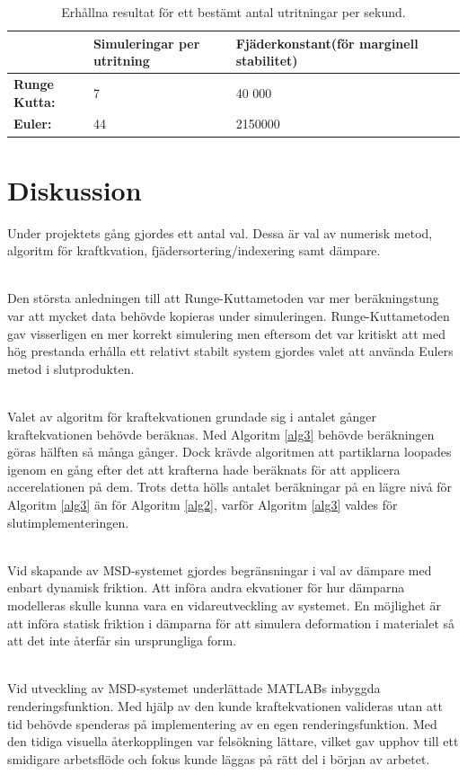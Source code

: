 \documentclass[a4paper,12pt,oneside,final,swedish]{extarticle}
\begin{document}
\begin{table}[htbp]
    \caption{Erhållna resultat för ett bestämt antal utritningar per sekund.}
    \label{table_example2}
    \begin{tabular*}{\hsize}{lllll}
      \hline %
       & \bfseries Simuleringar per utritning & \bfseries Fjäderkonstant(för marginell stabilitet)\\
      \hline
      \bfseries Runge Kutta: & 7 & 40 000\\
      \bfseries Euler: & 44 & 2150000\\
      \hline
    \end{tabular*}
\end{table}
\section{Diskussion}
Under projektets gång gjordes ett antal val. Dessa är val av numerisk metod, algoritm för kraftkvation, fjädersortering/indexering samt dämpare.

\noindent\\Den största anledningen till att Runge-Kuttametoden var mer beräkningstung var att mycket data behövde kopieras under simuleringen. Runge-Kuttametoden gav visserligen en mer korrekt simulering men eftersom det var kritiskt att med hög prestanda erhålla ett relativt stabilt system gjordes valet att använda Eulers metod i slutprodukten.

\noindent\\Valet av algoritm för kraftekvationen grundade sig i antalet gånger kraftekvationen behövde beräknas. Med Algoritm \ref{alg3} behövde beräkningen göras hälften så många gånger. Dock krävde algoritmen att partiklarna loopades igenom en gång efter det att krafterna hade beräknats för att applicera accerelationen på dem. Trots detta hölls antalet beräkningar på en lägre nivå för Algoritm \ref{alg3} än för Algoritm \ref{alg2}, varför Algoritm \ref{alg3} valdes för slutimplementeringen.

\noindent\\Vid skapande av MSD-systemet gjordes begränsningar i val av dämpare med enbart dynamisk friktion. Att införa andra ekvationer för hur dämparna modelleras skulle kunna vara en vidareutveckling av systemet. En möjlighet är att införa statisk friktion i dämparna för att simulera deformation i materialet så att det inte återfår sin ursprungliga form.

\noindent\\Vid utveckling av MSD-systemet underlättade MATLABs inbyggda renderingsfunktion. Med hjälp av den kunde kraftekvationen valideras utan att tid behövde spenderas på implementering av en egen renderingsfunktion. Med den tidiga visuella återkopplingen var felsökning lättare, vilket gav upphov till ett smidigare arbetsflöde och fokus kunde läggas på rätt del i början av arbetet.
\end{document}
